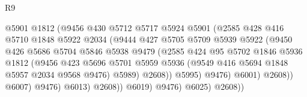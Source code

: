 \begin{lexlean}{R9}
\begin{coremodule}
                                    @5901
                                    @1812
                                    (@9456
                                      @430
                                      @5712
                                      @5717
                                      @5924
                                      @5901
                                      (@2585
                                        @428
                                        @416
                                        @5710
                                        @1848
                                        @5922
                                        @2034
                                        (@9444
                                          @427
                                          @5705
                                          @5709
                                          @5939
                                          @5922
                                          (@9450
                                            @426
                                            @5686
                                            @5704
                                            @5846
                                            @5938
                                            @9479
                                            (@2585
                                              @424
                                              @95
                                              @5702
                                              @1846
                                              @5936
                                              @1812
                                              (@9456
                                                @423
                                                @5696
                                                @5701
                                                @5959
                                                @5936
                                                (@9549 @416 @5694 @1848 @5957 @2034 @9568 @9476)
                                                @5989)
                                              @2608))
                                          @5995)
                                        @9476)
                                      @6001)
                                    @2608))
                                @6007)
                              @9476)
                            @6013)
                          @2608))
                      @6019)
                    @9476)
                  @6025)
                @2608))

\end{coremodule}
\end{lexlean}
